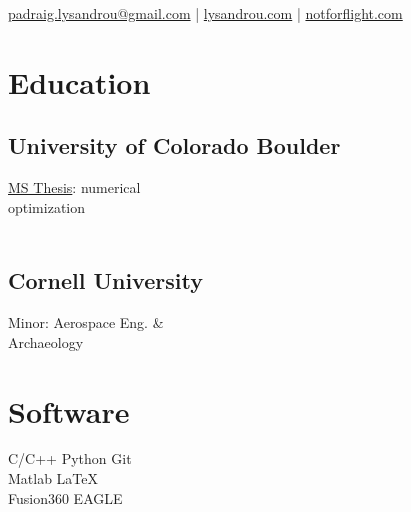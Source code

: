 \documentclass[]{deedy-resume-openfont}
\begin{document}
\lastupdated

	{\href{mailto:padraig.lysandrou@gmail.com}{padraig.lysandrou@gmail.com} | \href{www.lysandrou.com}{lysandrou.com} | \href{https://www.notforflight.com}{notforflight.com}}


\begin{minipage}[t]{0.27\textwidth} 


\section{\large{Education}} 
\subsection{\texorpdfstring{\large{University of \newline Colorado Boulder}}{University of Colorado Boulder}}
\small{\href{https://hanspeterschaub.info/Papers/grads/PadraigLysandrou.pdf}{MS Thesis}: numerical \\ optimization} \\
\
\subsection{\large{Cornell University}}
\small{Minor: Aerospace Eng. \& \\ Archaeology} \\
\vspace{\topsep} %


\section{\large{Software}}
C/C++ \textbullet{} Python \textbullet{} Git \\ Matlab \textbullet{} \LaTeX
\\
Fusion360 \textbullet{} EAGLE \\


\end{minipage}
\end{document}
